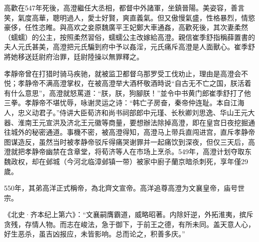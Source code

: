 高歡在547年死後，高澄繼任大丞相，都督中外諸軍，坐鎮晉陽。美姿容，善言笑，氣度高華，聰明過人，愛士好賢，爽直義氣。但又傲慢氣盛，性格暴烈，情慾豪侈，任性恣睢。與高欢之妾原魏廣平王妃鄭大車通姦，高歡死後，其次妻柔然（蠕蠕）的公主，按照柔然習俗，蠕蠕公主改嫁給高澄。親信崔季舒指稱薛置書的夫人元氏甚美，高澄把元氏騙到府中予以姦淫，元氏痛斥高澄是人面獸心。崔季舒將她移送廷尉府治罪，廷尉陸操以無罪釋之。

孝靜帝曾在打猎时骑马疾驰，就被监卫都督乌那罗受工伐劝止，理由是高澄会不悦；孝静帝不满高澄掌权，在被高澄举大酒杯敬酒時说“自古无不亡之国，朕活着有什么意思”，高澄就怒罵道：“朕，朕，狗腳朕！”並令中书黄门郎崔季舒打了他三拳。孝靜帝不堪忧辱，咏谢灵运之诗：“韩亡子房奋，秦帝仲连耻。本自江海人，忠义动君子。”侍讲大臣荀济和尚书祠部郎中元瑾、长秋卿刘思逸、华山王元大器、淮南王元宣洪及济北王元徽等商量，要想辦法除掉高澄，即在皇宫日夜挖掘通往城外的秘密通道。事機不密，被高澄得知，高澄马上带兵直闯进宫，直斥孝静帝图谋造反，虽然当时被孝静帝驳斥得痛哭谢罪并一起痛饮到深夜，但仅三天后，高澄就把孝静帝幽禁在含章堂，将荀济等人在市场上烹杀。549年，高澄计划夺取东魏政权，却在邺城（今河北临漳邺镇一带）被家中廚子蘭京暗杀刺死，享年僅29歲。

550年，其弟高洋正式稱帝，為北齊文宣帝。高洋追尊高澄为文襄皇帝，庙号世宗。

《北史·齐本纪上第六》：“文襄嗣膺霸道，威略昭著。内除奸逆，外拓淮夷，摈斥贪残，存情人物。而志在峻法，急于御下，于前王之德，有所未同。盖天意人心，好生恶杀，虽吉凶报应，未皆影响。总而论之，积善多庆。”


